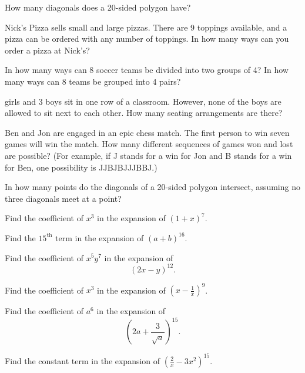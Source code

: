 \documentclass[12pt]{amsart}
\theoremstyle{definition}
\begin{document}
\problem How many diagonals does a 20-sided polygon have?\vspace{.05in}

\problem Nick's Pizza sells small and large pizzas.  There are 9 toppings available, and a pizza can be ordered with any number of toppings.  In how many ways can you order a pizza at Nick's?\vspace{.05in}

\problem In how many ways can 8 soccer teams be divided into two groups of 4?  In how many ways can 8 teams be grouped into 4 pairs? \vspace{.05in}

 girls and 3 boys sit in one row of a classroom. However, none of the boys are allowed to sit next to each other.  How many seating arrangements are there?  \vspace{.05in}

\problem Ben and Jon are engaged in an epic chess match.  The first person to win seven games will win the match.  How many different sequences of games won and lost are possible?  (For example, if J stands for a win for Jon and B stands for a win for Ben, one possibility is JJBJBJJJBBJ.) \vspace{.05in}

\problem In how many points do the diagonals of a 20-sided polygon intersect, assuming no three diagonals meet at a point?\vspace{.05in}

\problem Find the coefficient of $x^3$ in the expansion of $(1+x)^7$.\vspace{.05in}


\problem Find the $15^{\text{th}}$ term in the expansion of $(a+b)^{16}$.\vspace{.05in}

\problem  Find the coefficient of $x^5y^7$ in the expansion of $$(2x-y)^{12}.$$%

\problem Find the coefficient of $x^3$ in the expansion of $(x-\frac{1}{x})^9$.\vspace{.05in}

\problem Find the coefficient of $a^6$ in the expansion of $$(2a+\frac{3}{\sqrt a})^{15}.$$%

\problem  Find the constant term in the expansion of $(\frac{2}{x}-3x^2)^{15}$.\vspace{.05in}
\end{document}

